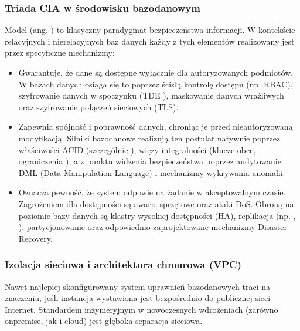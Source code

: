 \documentclass[a4paper,11pt,english,openany,oneside]{sphinxmanual}
\begin{document}
\subsubsection{Triada CIA w środowisku bazodanowym}
\label{\detokenize{rozdzial_2/rozdzial_27/rozdzial_1:triada-cia-w-srodowisku-bazodanowym}}
\sphinxAtStartPar
Model  (ang. ) to klasyczny paradygmat bezpieczeństwa informacji. W kontekście relacyjnych i nierelacyjnych baz danych każdy z tych elementów realizowany jest przez specyficzne mechanizmy:
\begin{itemize}
\item {} 
\sphinxAtStartPar
{} Gwarantuje, że dane są dostępne wyłącznie dla autoryzowanych podmiotów. W bazach danych osiąga się to poprzez ścisłą kontrolę dostępu (np. RBAC), szyfrowanie danych w spoczynku (TDE \sphinxhyphen{} ), maskowanie danych wrażliwych oraz szyfrowanie połączeń sieciowych (TLS).

\item {} 
\sphinxAtStartPar
{} Zapewnia spójność i poprawność danych, chroniąc je przed nieautoryzowaną modyfikacją. Silniki bazodanowe realizują ten postulat natywnie poprzez właściwości ACID (szczególnie ), więzy integralności (klucze obce, ograniczenia ), a z punktu widzenia bezpieczeństwa \textendash{} poprzez audytowanie DML (Data Manipulation Language) i mechanizmy wykrywania anomalii.

\item {} 
\sphinxAtStartPar
{} Oznacza pewność, że system odpowie na żądanie w akceptowalnym czasie. Zagrożeniem dla dostępności są awarie sprzętowe oraz ataki DoS. Obroną na poziomie bazy danych są klastry wysokiej dostępności (HA), replikacja (np. , ), partycjonowanie oraz odpowiednio zaprojektowane mechanizmy Disaster Recovery.

\end{itemize}


\subsubsection{Izolacja sieciowa i architektura chmurowa (VPC)}
\label{\detokenize{rozdzial_2/rozdzial_27/rozdzial_1:izolacja-sieciowa-i-architektura-chmurowa-vpc}}
\sphinxAtStartPar
Nawet najlepiej skonfigurowany system uprawnień bazodanowych traci na znaczeniu, jeśli instancja wystawiona jest bezpośrednio do publicznej sieci Internet. Standardem inżynieryjnym w nowoczesnych wdrożeniach (zarówno on\sphinxhyphen{}premise, jak i cloud) jest głęboka separacja sieciowa.
\end{document}
